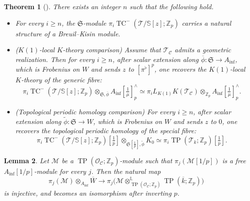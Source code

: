 \documentclass[11pt]{amsart}
\newtheorem{lemma}{Lemma}[section]
\newtheorem{thm}[lemma]{Theorem}
\numberwithin{equation}{section}
\renewcommand{\L}{\mathbb{L}}
\newcommand{\Z}{\mathbb{Z}}
\newcommand{\sC}{\mathcal{C}}
\newcommand{\sO}{\mathcal{O}}
\newcommand{\sT}{\mathcal{T}}
\newcommand{\sM}{\mathcal{M}}
\newcommand{\mf}{\mathfrak}
\newcommand{\mS}{\mf{S}}
\numberwithin{equation}{section}
\newcommand{\ol}{\overline}
\newcommand{\Ainf}{A_{\operatorname{inf}}}
\newcommand{\TP}{\operatorname{TP}}
\newcommand{\TCn}{\operatorname{TC}^{-}}
\newcommand{\bS}{\mathbb{S}}
\newcommand{\LK}{{L_{K(1)}}}
\begin{document}
\begin{thm}[{\cite[Theorem 1.9]{M26}}]\label{ncbms}
There exists an integer $n$ such that the following hold.
\begin{itemize}
  \item[(1)] For every $i\geq n$, the $\mS$-module $\pi_i \TCn(\sT/\bS[z];\Z_p)$ carries a natural structure of a Breuil--Kisin module.

  \item[(2)] \textup{($K(1)$-local $K$-theory comparison)} Assume that $\sT_{\sC}$ admits a geometric realization. Then for every $i\geq n$, after scalar extension along $\ol{\phi}:\mS\to \Ainf$, which is Frobenius on $W$ and sends $z$ to $[\pi^\flat]^p$, one recovers the $K(1)$-local $K$-theory of the generic fibre:
  \[
  \pi_i \TCn(\sT/\bS[z];\Z_p)\otimes_{\mS,\ol{\phi}} \Ainf[\tfrac{1}{\mu}]^{\wedge}_p
  \simeq
  \pi_i\LK K(\sT_{\sC})\otimes_{\Z_p} \Ainf[\tfrac{1}{\mu}]^{\wedge}_p.
  \]

  \item[(3)] \textup{(Topological periodic homology comparison)} For every $i\geq n$, after scalar extension along $\tilde{\phi}:\mS\to W$, which is Frobenius on $W$ and sends $z$ to $0$, one recovers the topological periodic homology of the special fibre:
  \[
  \pi_i \TCn(\sT/\bS[z];\Z_p)[\tfrac{1}{p}] \otimes_{\mS[\tfrac{1}{p}],\tilde{\phi}} K_0
  \simeq
  \pi_i \TP(\sT_k;\Z_p)[\tfrac{1}{p}].
  \]
\end{itemize}
\end{thm}

\begin{lemma}\label{tpinj}
Let $\sM$ be a $\TP(\sO_\sC;\Z_p)$-module such that $\pi_j(\sM[1/p])$ is a free $\Ainf[1/p]$-module for every $j$. Then the natural map
\[
\pi_j(\sM)\otimes_{\Ainf}\ol{W}
\longrightarrow
\pi_j\bigl(\sM\otimes^\L_{\TP(\sO_\sC;\Z_p)} \TP(\ol{k};\Z_p)\bigr)
\]
is injective, and becomes an isomorphism after inverting $p$.
\end{lemma}
\end{document}
